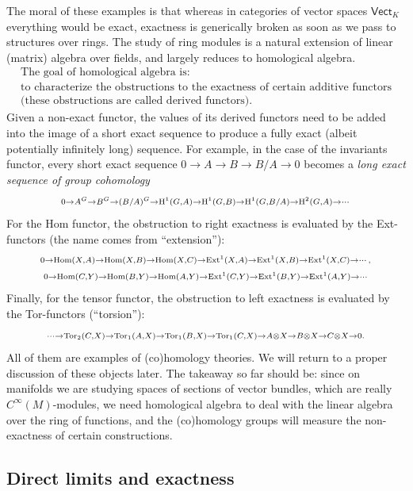 The moral of these examples is that whereas in categories of vector spaces $\mathsf{Vect}_K$ everything would be exact, exactness is generically broken as soon as we pass to structures over rings. The study of ring modules is a natural extension of linear (matrix) algebra over fields, and largely reduces to homological algebra.
\[
\boxed{\begin{array}{c}
\text{The goal of homological algebra is:}\\
\text{to characterize the obstructions to the exactness of certain additive functors}\\ \text{(these obstructions are called derived functors).}
\end{array}}
\]
Given a non-exact functor, the values of its derived functors need to be added into the image of a short exact sequence to produce a fully exact (albeit potentially infinitely long) sequence. For example, in the case of the invariants functor, every short exact sequence $0\to A\to B\to B/A\to 0$ becomes a \emph{long exact sequence of group cohomology}
\[
\scriptstyle
0\to A^G\to B^G\to (B/A)^G\to \mathrm{H}^1(G,A)\to \mathrm{H}^1(G,B)\to \mathrm{H}^1(G,B/A)\to \mathrm{H}^2(G,A)\to\cdots
\]
For the Hom functor, the obstruction to right exactness is evaluated by the Ext-functors (the name comes from ``extension''):
\begin{gather}
    \scriptstyle
    0\to \operatorname{Hom}(X,A)\to \operatorname{Hom}(X,B)\to\operatorname{Hom}(X,C)\to \operatorname{Ext}^1(X,A)\to \operatorname{Ext}^1(X,B)\to\operatorname{Ext}^1(X,C)\to\cdots,\\
    \scriptstyle
    0\to \operatorname{Hom}(C,Y)\to \operatorname{Hom}(B,Y)\to\operatorname{Hom}(A,Y)\to \operatorname{Ext}^1(C,Y)\to \operatorname{Ext}^1(B,Y)\to\operatorname{Ext}^1(A,Y)\to\cdots
\end{gather}
Finally, for the tensor functor, the obstruction to left exactness is evaluated by the Tor-functors (``torsion''):
\[
\scriptstyle
\cdots\to \operatorname{Tor}_2(C,X)\to \operatorname{Tor}_1(A,X)\to \operatorname{Tor}_1(B,X)\to\operatorname{Tor}_1(C,X)\to A\otimes X\to B\otimes X\to C\otimes X\to 0.
\]
All of them are examples of (co)homology theories. We will return to a proper discussion of these objects later. The takeaway so far should be: since on manifolds we are studying spaces of sections of vector bundles, which are really $C^\infty(M)$-modules, we need homological algebra to deal with the linear algebra over the ring of functions, and the (co)homology groups will measure the non-exactness of certain constructions.






\subsection{Direct limits and exactness}

